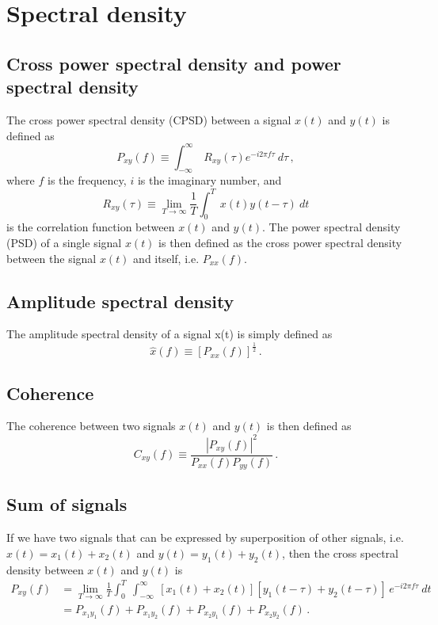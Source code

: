 \section{Spectral density \label{appendix:spectral_density}}

\subsection{Cross power spectral density and power spectral density}
The cross power spectral density (CPSD) between a signal $x(t)$ and $y(t)$ is defined as
\begin{equation}
	P_{xy}(f) \equiv \int_{-\infty}^\infty\ R_{xy}(\tau) e^{-i2\pi f \tau}\ d\tau\,,
\end{equation}
where $f$ is the frequency, $i$ is the imaginary number, and
\begin{equation}
	R_{xy}(\tau) \equiv \lim_{T\to\infty}\frac{1}{T}\int_0^T\ x(t)y(t-\tau)\ dt
\end{equation}
is the correlation function between $x(t)$ and $y(t)$.
The power spectral density (PSD) of a single signal $x(t)$ is then defined as the cross power spectral density between the signal $x(t)$ and itself, i.e. $P_{xx}(f)$.

\subsection{Amplitude spectral density}
The amplitude spectral density of a signal x(t) is simply defined as
\begin{equation}
	\hat{x}(f) \equiv \left[P_{xx}(f)\right]^{\frac{1}{2}}\,.
\end{equation}

\subsection{Coherence}
The coherence between two signals $x(t)$ and $y(t)$ is then defined as
\begin{equation}
	C_{xy}(f) \equiv \frac{\left\lvert P_{xy}(f)\right\rvert^2}{P_{xx}(f)P_{yy}(f)}\,.
	\label{eqn:coherence}
\end{equation}

\subsection{Sum of signals}
If we have two signals that can be expressed by superposition of other signals, i.e. $x(t)=x_1(t)+x_2(t)$ and $y(t)=y_1(t)+y_2(t)$, then the cross spectral density between $x(t)$ and $y(t)$ is
\begin{equation}
	\begin{split}
		P_{xy}(f) &= \lim_{T\to\infty}\frac{1}{T}\int_0^T\ \int_{-\infty}^\infty\  \left[x_1(t)+x_2(t)\right][y_1(t-\tau)+y_2(t-\tau)]\,e^{-i2\pi f\tau}\ dt \\
		&= P_{x_1y_1}(f) + P_{x_1y_2}(f) + P_{x_2y_1}(f) + P_{x_2y_2}(f)\,.
	\end{split} 
\end{equation}
